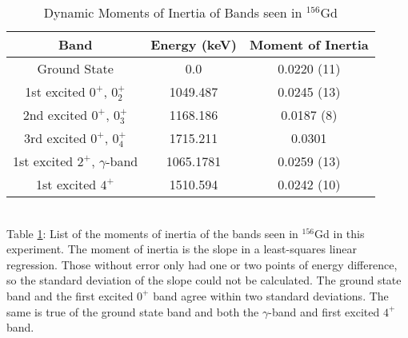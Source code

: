 \begin{table}[!]
    \centering
    \caption{Dynamic Moments of Inertia of Bands seen in $^{156}$Gd}
    \begin{tabular}{c|c|c}
        \toprule
        Band & Energy (keV) & Moment of Inertia  \\
        \hline
        Ground State & 0.0 & 0.0220 (11) \\
        1st excited $0^+$, $0^+_2$ & 1049.487 & 0.0245 (13) \\
        2nd excited $0^+$, $0^+_3$ & 1168.186 & 0.0187 (8) \\
        3rd excited $0^+$, $0^+_4$ & 1715.211 & 0.0301 \\
        1st excited $2^+$, $\gamma$-band & 1065.1781 & 0.0259 (13) \\
        1st excited $4^+$ & 1510.594 & 0.0242 (10)  \\
        \bottomrule
    \end{tabular}
    \\[2pt]
    \footnotesize
    \label{tab:156_Dynamic}
    Table \ref{tab:156_Dynamic}: List of the moments of inertia of the bands seen in $^{156}$Gd in this experiment. The moment of inertia is the slope in a least-squares linear regression. Those without error only had one or two points of energy difference, so the standard deviation of the slope could not be calculated. The ground state band and the first excited $0^+$ band agree within two standard deviations. The same is true of the ground state band and both the $\gamma$-band and first excited $4^+$ band.
\end{table}